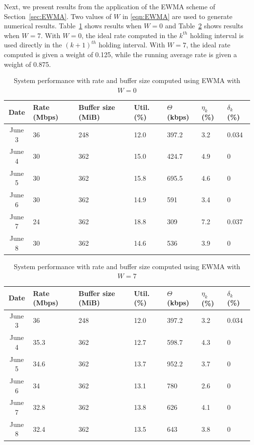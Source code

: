 Next, we present results from the application of the EWMA scheme
of Section~\ref{sec:EWMA}.
Two values of $W$ in \eqref{eqn:EWMA} are used to generate numerical
results.
Table~\ref{tbl:yesterday} shows results when $W=0$ and Table~\ref{tbl:W7} shows results
when $W=7$. With $W=0$, the ideal rate computed in the $k^{th}$ holding
interval is used directly in the $(k+1)^{th}$ holding interval.
With $W=7$, the ideal rate computed is given a weight of 0.125, while the running average rate is given a weight of 0.875.
\begin{table}
\caption{System performance with rate and buffer size computed using EWMA with $W=0$}
\centering
\begin{tabular}{| c | p{0.4in} | p{0.3in} | p{0.3in} | p{0.3in}| p{0.3in} |p{0.3in}|} \hline
Date & Rate (Mbps) & Buffer size (MiB) & Util. (\%) &  $\Theta$ (kbps) & $\eta_k$ (\%) & $\delta_k$ (\%)\\ \hline
June 3 & 36 & 248 & 12.0 &397.2 &3.2 &0.034\\ \hline
June 4 & 30 &362 &15.0 & 424.7 & 4.9&0 \\ \hline
June 5 &30 &362 &15.8 &695.5 &4.6&0 \\ \hline
June 6 &30 & 362 &14.9 &591 &3.4&0 \\ \hline
June 7 & 24 & 362 & 18.8 &309 & 7.2 &0.037\\ \hline
June 8 & 30 & 362& 14.6 &536 & 3.9 &0\\ \hline
\end{tabular}
\label{tbl:yesterday}
\end{table}
\vspace{-0.1in}
\begin{table}[!ht]
\centering
\caption{System performance with rate and buffer size computed using EWMA with $W=7$}
\begin{tabular}{| c | p{0.4in} | p{0.3in} | p{0.3in} | p{0.3in}| p{0.3in} |p{0.3in}|} \hline
Date & Rate (Mbps) & Buffer size (MiB) & Util. (\%) &  $\Theta$ (kbps) & $\eta_k$ (\%) & $\delta_k$ (\%)\\ \hline
June 3 & 36 & 248 & 12.0 &397.2 &3.2 &0.034 \\ \hline
June 4 & 35.3&362 &12.7 & 598.7 & 4.3&0 \\ \hline
June 5 &34.6 & 362 &13.7 &952.2 &3.7 &0\\ \hline
June 6 &34 & 362 &13.1 &780 &2.6&0 \\ \hline
June 7 & 32.8 & 362 & 13.8 &626 & 4.1&0 \\ \hline
June 8 & 32.4 & 362& 13.5 &643 & 3.8&0 \\ \hline
\end{tabular}

\label{tbl:W7}
\end{table}

